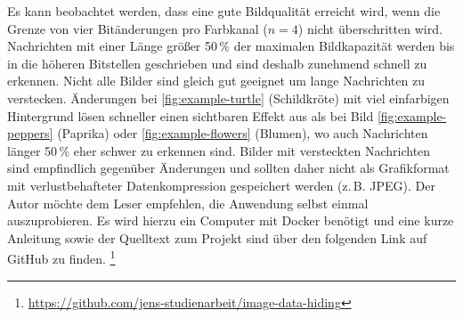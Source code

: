 \newpage



\newpage



\newpage



\newpage

\noindent
Es kann beobachtet werden, dass
eine gute Bildqualität erreicht wird,
wenn die Grenze von vier Bitänderungen pro Farbkanal ($n = 4$) nicht überschritten wird.
Nachrichten mit einer Länge größer 50\,\% der maximalen Bildkapazität werden bis in die höheren
Bitstellen geschrieben und sind deshalb zunehmend schnell zu erkennen.
Nicht alle Bilder sind gleich gut geeignet um lange Nachrichten zu verstecken.
Änderungen bei \ref{fig:example-turtle} (Schildkröte) mit viel einfarbigen Hintergrund
lösen schneller einen sichtbaren Effekt aus als bei Bild \ref{fig:example-peppers}
(Paprika) oder \ref{fig:example-flowers} (Blumen), wo auch Nachrichten länger
50\,\% eher schwer zu erkennen sind. Bilder mit versteckten Nachrichten
sind empfindlich gegenüber Änderungen und sollten daher nicht als
Grafikformat mit verlustbehafteter Datenkompression gespeichert werden (z.\,B. JPEG).
Der Autor möchte dem Leser empfehlen, die Anwendung selbst einmal auszuprobieren.
Es wird hierzu ein Computer mit Docker benötigt und eine kurze Anleitung
sowie der Quelltext zum Projekt sind über den folgenden Link auf GitHub zu finden.
\footnote{\url{https://github.com/jens-studienarbeit/image-data-hiding}}
